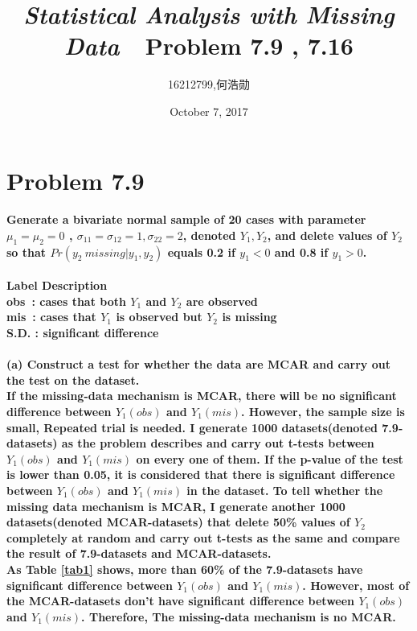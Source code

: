 \documentclass[a4paper]{article}
\title{\emph{Statistical Analysis with Missing Data}\ \ Problem 7.9 , 7.16}
\author{16212799,何浩勋}
\date{October 7, 2017}
\newcommand{\yahei}{\CJKfamily{yahei}}
\begin{document}
\fontsize{12pt}{18pt}\selectfont\yahei
\maketitle

\section{Problem 7.9}
\paragraph{\fontsize{10pt}{14pt}\selectfont\yahei
Generate a bivariate normal sample of 20 cases with parameter\\ $\mu_1=\mu_2=0$ , $\sigma_{11}=\sigma_{12}=1,\sigma_{22}=2$, denoted $Y_1,Y_2$, and delete values of $Y_2$ so that $Pr(y_2  \ missing | y_1,y_2)$ equals 0.2 if $y_1 < 0$ and 0.8 if $y_1 > 0$.
}

\paragraph{\fontsize{10pt}{14pt}\selectfont\yahei
Label Description\\
obs\ : cases that both $Y_1$ and $Y_2$ are observed\\
mis\ : cases that $Y_1$ is observed but $Y_2$ is missing\\
S.D.  : significant difference
}

\paragraph{\fontsize{10pt}{14pt}\selectfont\yahei
(a) Construct a test for whether the data are MCAR and carry out the test on the dataset.
\\
If the missing-data mechanism is MCAR, there will be no significant difference between $Y_1(obs)$ and $Y_1(mis)$. However, the sample size is small, Repeated trial is needed.
I generate 1000 datasets(denoted 7.9-datasets) as the problem describes and carry out t-tests between $Y_1(obs)$ and $Y_1(mis)$ on every one of them. If the p-value of the test is lower than 0.05, it is considered that there is significant difference between $Y_1(obs)$ and $Y_1(mis)$ in the dataset.
To tell whether the missing data mechanism is MCAR, I generate another 1000 datasets(denoted MCAR-datasets) that delete 50\% values of $Y_2$ completely at random  and carry out t-tests as the same and compare the result of 7.9-datasets and MCAR-datasets.
\\
As Table \ref{tab1} shows, more than 60\% of the 7.9-datasets have significant difference between $Y_1(obs)$ and $Y_1(mis)$. However, most of the MCAR-datasets don't have significant difference between $Y_1(obs)$ and $Y_1(mis)$. Therefore, The missing-data mechanism is no MCAR.
}
\end{document}
